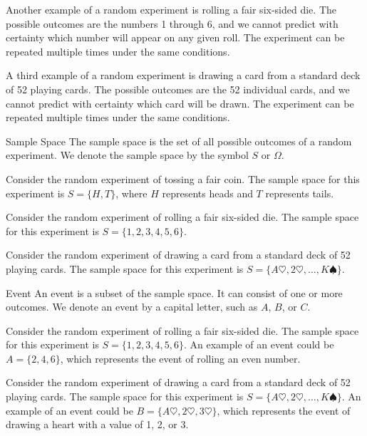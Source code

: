 \documentclass[openany]{book}
\begin{document}
\begin{example}
    Another example of a random experiment is rolling a fair six-sided die. The possible outcomes are the numbers 1 through 6, and we cannot predict with certainty which number will appear on any given roll. The experiment can be repeated multiple times under the same conditions.
\end{example}

\begin{example}
    A third example of a random experiment is drawing a card from a standard deck of 52 playing cards. The possible outcomes are the 52 individual cards, and we cannot predict with certainty which card will be drawn. The experiment can be repeated multiple times under the same conditions.
\end{example}


\begin{mydefinition}{Sample Space}
The sample space is the set of all possible outcomes of a random experiment. We denote the sample space by the symbol $S$ or $\Omega$.
\end{mydefinition}

\begin{example}
    Consider the random experiment of tossing a fair coin. The sample space for this experiment is $S = \{H, T\}$, where $H$ represents heads and $T$ represents tails.
\end{example}

\begin{example}
    Consider the random experiment of rolling a fair six-sided die. The sample space for this experiment is $S = \{1, 2, 3, 4, 5, 6\}$.
\end{example}

\begin{example}
    Consider the random experiment of drawing a card from a standard deck of 52 playing cards. The sample space for this experiment is $S = \{A\heartsuit, 2\heartsuit, \ldots, K\spadesuit\}$.
\end{example}


\begin{mydefinition}{Event}
    An event is a subset of the sample space. It can consist of one or more outcomes. We denote an event by a capital letter, such as $A$, $B$, or $C$.
\end{mydefinition}

\begin{example}
    Consider the random experiment of rolling a fair six-sided die. The sample space for this experiment is $S = \{1, 2, 3, 4, 5, 6\}$. An example of an event could be $A = \{2, 4, 6\}$, which represents the event of rolling an even number.
\end{example}
\begin{example}
    Consider the random experiment of drawing a card from a standard deck of 52 playing cards. The sample space for this experiment is $S = \{A\heartsuit, 2\heartsuit, \ldots, K\spadesuit\}$. An example of an event could be $B = \{A\heartsuit, 2\heartsuit, 3\heartsuit\}$, which represents the event of drawing a heart with a value of 1, 2, or 3.
\end{example}
\end{document}
